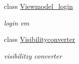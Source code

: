 \begin{DoxyCompactItemize}
class \hyperlink{class_lightdeath_1_1_viewmodel__login}{Viewmodel\+\_\+login}
\begin{DoxyCompactList}\small\item\em login vm \end{DoxyCompactList}\item 
class \hyperlink{class_lightdeath_1_1_visibilityconverter}{Visibilityconverter}
\begin{DoxyCompactList}\small\item\em visibilitzy converter \end{DoxyCompactList}\end{DoxyCompactItemize}
